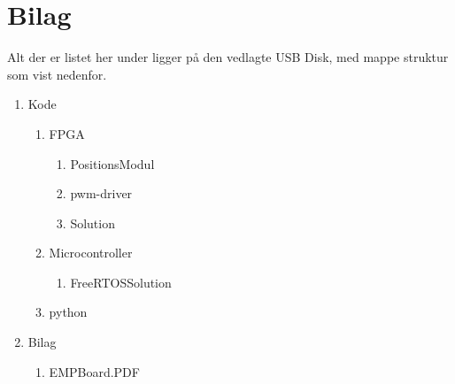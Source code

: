 \appendix
\section{Bilag} \hfill
Alt der er listet her under ligger på den vedlagte USB Disk, med mappe struktur som vist nedenfor.
\label{sec:bilag}
\begin{enumerate}[noitemsep]
	\item Kode
	\begin{enumerate}[noitemsep]
		\item FPGA
			\begin{enumerate}
				\item PositionsModul
				\item pwm-driver
				\item Solution
			\end{enumerate}
		\item Microcontroller
		\begin{enumerate}
			\item FreeRTOS\textunderscore Solution
		\end{enumerate}
		\item python
	\end{enumerate}
	\item Bilag
	\begin{enumerate}[noitemsep]
		\item EMPBoard.PDF \label{itm:empboard}
	\end{enumerate}
\end{enumerate}
